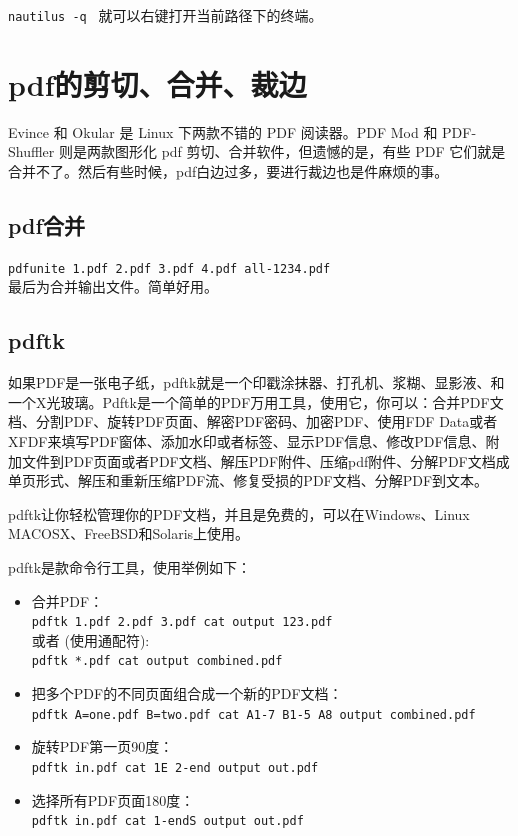 {\verb|nautilus -q |
就可以右键打开当前路径下的终端。


\section{pdf的剪切、合并、裁边}
Evince 和 Okular 是 Linux 下两款不错的 PDF 阅读器。PDF Mod 和 PDF-Shuffler 则是两款图形化 pdf 剪切、合并软件，但遗憾的是，有些 PDF 它们就是合并不了。然后有些时候，pdf白边过多，要进行裁边也是件麻烦的事。

\subsection{pdf合并}
\verb|pdfunite 1.pdf 2.pdf 3.pdf 4.pdf all-1234.pdf|\\
最后为合并输出文件。简单好用。

\subsection{pdftk}
如果PDF是一张电子纸，pdftk就是一个印戳涂抹器、打孔机、浆糊、显影液、和一个X光玻璃。Pdftk是一个简单的PDF万用工具，使用它，你可以：合并PDF文档、分割PDF、旋转PDF页面、解密PDF密码、加密PDF、使用FDF Data或者XFDF来填写PDF窗体、添加水印或者标签、显示PDF信息、修改PDF信息、附加文件到PDF页面或者PDF文档、解压PDF附件、压缩pdf附件、分解PDF文档成单页形式、解压和重新压缩PDF流、修复受损的PDF文档、分解PDF到文本。

pdftk让你轻松管理你的PDF文档，并且是免费的，可以在Windows、Linux MACOSX、FreeBSD和Solaris上使用。

pdftk是款命令行工具，使用举例如下：
\begin{itemize}
\item 合并PDF：\\
\verb|pdftk 1.pdf 2.pdf 3.pdf cat output 123.pdf|\\
或者 (使用通配符):\\
\verb|pdftk *.pdf cat output combined.pdf|

\item 把多个PDF的不同页面组合成一个新的PDF文档：\\
\verb|pdftk A=one.pdf B=two.pdf cat A1-7 B1-5 A8 output combined.pdf|

\item 旋转PDF第一页90度：\\
\verb|pdftk in.pdf cat 1E 2-end output out.pdf|

\item 选择所有PDF页面180度：\\
\verb|pdftk in.pdf cat 1-endS output out.pdf|


\end{itemize}}
